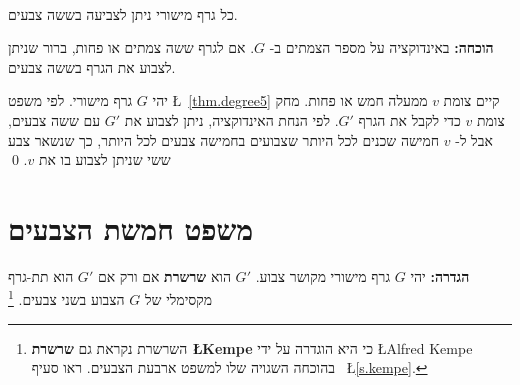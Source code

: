 \begin{theorem}\label{thm.sixcolor}\mbox{}\\
כל גרף מישורי ניתן לצביעה בששה צבעים.
\end{theorem}
\textbf{הוכחה:}
באינדוקציה על מספר הצמתים ב-%
$G$.
אם לגרף ששה צמתים או פחות, ברור שניתן לצבוע את הגרף בששה צבעים.

יהי
$G$
גרף מישורי. לפי משפט
\L{~\ref{thm.degree5}}
קיים צומת
$v$
ממעלה חמש או פחות. מחק צומת
$v$
כדי לקבל את הגרף
$G'$.
לפי הנחת האינדוקציה, ניתן לצבוע את
$G'$
עם ששה צבעים, אבל ל-%
$v$
חמישה שכנים לכל היותר שצבועים בחמישה 
צבעים לכל היותר, כך שנשאר צבע ששי שניתן לצבוע בו את
$v$. \qed

\begin{figure}
\begin{center}
\begin{subfigure}{.4\textwidth}
\caption{}\label{}
\end{subfigure}
\hspace{3em}
\begin{subfigure}{.4\textwidth}
\caption{}\label{}
\end{subfigure}
\end{center}
\end{figure}

\section{משפט חמשת הצבעים}

\textbf{הגדרה:}
יהי
$G$
גרף מישורי מקושר צבוע. 
$G'$
הוא
\textbf{שרשרת}
אם ורק אם
$G'$
הוא תת-גרף מקסימלי של
$G$
הצבוע בשני צבעים.%
\footnote{%
השרשרת נקראת גם
\textbf{שרשרת \L{Kempe}}
כי היא הוגדרה על ידי
\L{Alfred Kempe}
בהוכחה השגויה שלו למשפט ארבעת הצבעים. ראו סעיף~%
\L{\ref{s.kempe}}.}

